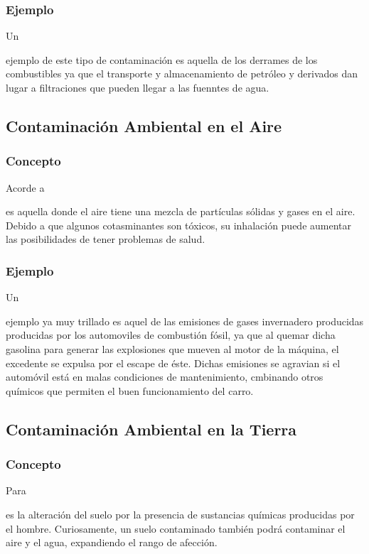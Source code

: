 \documentclass[stu, 12pt, letterpaper, donotrepeattitle, floatsintext, natbib]{apa7}
\begin{document}
\subsubsection{Ejemplo}
Un\begin{justifying}
  ejemplo de este tipo de contaminación es aquella de los derrames de los combustibles ya que el transporte y almacenamiento de petróleo y derivados
  dan lugar a filtraciones que pueden llegar a las fuenntes de agua.\par
  \end{justifying}
\vspace{\baselineskip}
\subsection{Contaminación Ambiental en el Aire}
\subsubsection{Concepto}
Acorde a \cite{unknown-author-no-dateB} %
\begin{justifying}
  es aquella donde el aire tiene una mezcla de partículas sólidas y gases en el aire. Debido a que algunos cotasminantes
  son tóxicos, su inhalación puede aumentar las posibilidades de tener problemas de salud.\par
\end{justifying}
\vspace{\baselineskip}
\subsubsection{Ejemplo}
Un \begin{justifying}
  ejemplo ya muy trillado es aquel de las emisiones de gases invernadero producidas producidas por los automoviles de combustión fósil, ya que
al quemar dicha gasolina para generar las explosiones que mueven al motor de la máquina, el excedente se expulsa por el escape de éste. Dichas emisiones
se agravian si el automóvil está en malas condiciones de mantenimiento, cmbinando otros químicos que permiten el buen funcionamiento del carro.\par
\end{justifying}
\vspace{\baselineskip}
\subsection{Contaminación Ambiental en la Tierra}
\subsubsection{Concepto}
Para \cite{unknown-author-2019} %
\begin{justifying}
  es la alteración del suelo por la presencia de sustancias químicas producidas por el hombre. Curiosamente, un suelo contaminado
  también podrá contaminar el aire y el agua, expandiendo el rango de afección.\par
\end{justifying}
\vspace{\baselineskip}
\end{document}
